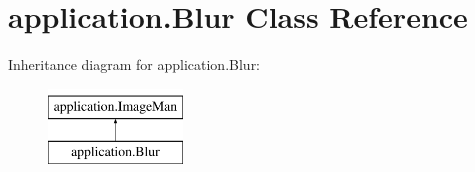 \hypertarget{classapplication_1_1_blur}{}\section{application.\+Blur Class Reference}
\label{classapplication_1_1_blur}
Inheritance diagram for application.\+Blur\+:\begin{figure}[H]
\begin{center}
\leavevmode
\includegraphics[height=2.000000cm]{classapplication_1_1_blur}
\end{center}
\end{figure}
